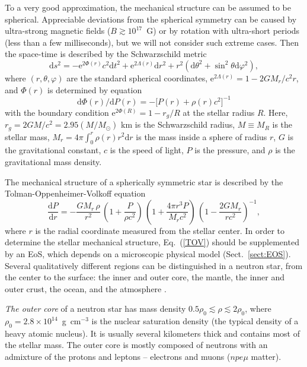 \documentclass[smallextended]{svjour3}       %
\newcommand{\beq}{\begin{equation}}
\newcommand{\eeq}{\end{equation}}
\newcommand{\dd}{\mathrm{d}}
\newcommand{\gcc}{\mbox{g~cm$^{-3}$}}
\newcommand{\req}[1]{Eq.~(\ref{#1})}
\begin{document}
To a very good approximation, the  mechanical structure can
be assumed to be spherical. Appreciable deviations from the
spherical symmetry can be caused by ultra-strong magnetic
fields ($B\gtrsim10^{17}$~G) or by rotation with ultra-short
periods (less than a few milliseconds), but we will not
consider such extreme cases.  Then the space-time is
described by the Schwarzschild metric
\citep[e.g.][]{MisnerTW}
\beq
\dd s^2 = - \mathrm{e}^{2\Phi(r)} c^2 \dd t^2 +
\mathrm{e}^{2\Lambda(r)} \dd r^2 + r^2 (\dd \theta^2 +
\sin^2\theta \dd \varphi^2),
\label{Schw}
\eeq
where $(r,\theta,\varphi)$ are the standard spherical
coordinates, $\mathrm{e}^{2\Lambda(r)}=1-2GM_r/c^2r$,
and
$\Phi(r)$ is determined by equation
\beq
   \dd \Phi(r)/\dd P(r) = - \big[P(r) + \rho(r) c^2\big]^{-1}
\label{Phi}
\eeq
with the boundary condition $\mathrm{e}^{2\Phi(R)}=1-r_g/R$
at the stellar radius $R$.  Here,
$r_g=2GM/c^2=2.95(M/M_\odot)$ km is the Schwarzschild
radius, $M\equiv M_R$ is the stellar mass,
$M_r=4\pi\int_0^r\rho(r)r^2\dd r$ is the mass inside a sphere of radius
$r$, 
$G$ is the gravitational constant, $c$ is the speed
of light, $P$ is the pressure, and $\rho$ is the
gravitational mass density.

The mechanical structure of a spherically symmetric star is
described by the Tolman-Oppenheimer-Volkoff equation
\beq
   \frac{\dd P}{\dd r} = 
    - \frac{GM_r\,\rho}{r^2}\,
      \left( 1 + \frac{P}{\rho c^2} \right)\,
      \left( 1 + \frac{4\pi r^3 P}{M_r c^2} \right)\,
      \left( 1 - \frac{2GM_r}{rc^2} \right)^{-1}, %
\label{TOV}
\eeq
where $r$ is the radial coordinate measured from the stellar
center. In order to determine the stellar mechanical
structure, \req{TOV} should be supplemented by an EoS, which
depends on a microscopic physical model
(Sect.~\ref{sect:EOS}).
Several qualitatively different regions can be distinguished
in a neutron star, from the center to the surface: the inner
and outer core, the mantle, the inner and outer crust, the
ocean, and the atmosphere \citep[e.g.,][]{HPY07}.

\emph{The outer core} of a neutron star has mass density
$0.5 \rho_0 \lesssim \rho \lesssim 2\rho_0$, where
$\rho_0=2.8\times10^{14}$~\gcc{} is the nuclear saturation
density (the typical density of a heavy atomic nucleus). It
is usually several kilometers thick and contains most of the stellar mass. The outer core is mostly
composed of neutrons with an admixture of the
protons and leptons -- electrons and
muons ($npe\mu$ matter).
\end{document}
